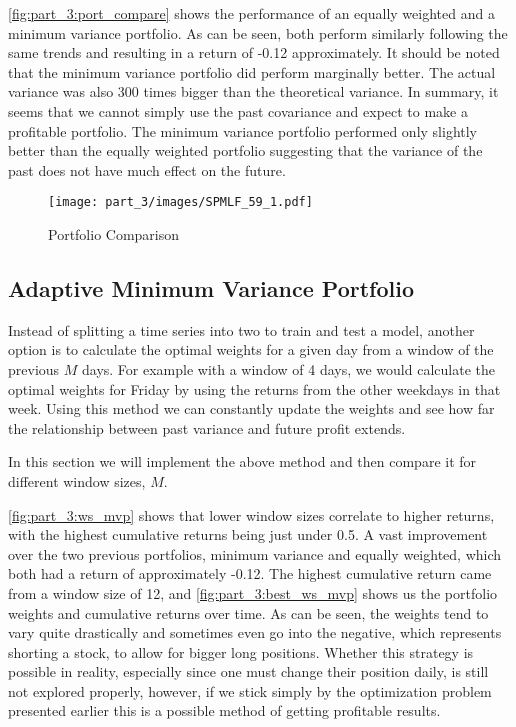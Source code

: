 \autoref{fig:part_3:port_compare} shows the performance of an equally weighted and a minimum variance portfolio. As can be seen, both perform similarly following the same trends and resulting in a return of -0.12 approximately. It should be noted that the minimum variance portfolio did perform marginally better. The actual variance was also 300 times bigger than the theoretical variance. In summary, it seems that we cannot simply use the past covariance and expect to make a profitable portfolio. The minimum variance portfolio performed only slightly better than the equally weighted portfolio suggesting that the variance of the past does not have much effect on the future.

\begin{figure}[!htb]
    \centering
    \texttt{[image: part\_3/images/SPMLF\_59\_1.pdf]}
    \caption{Portfolio Comparison}
    \label{fig:part_3:port_compare}
\end{figure}

\subsection{Adaptive Minimum Variance Portfolio}

Instead of splitting a time series into two to train and test a model, another option is to calculate the optimal weights for a given day from a window of the previous $M$ days. For example with a window of 4 days, we would calculate the optimal weights for Friday by using the returns from the other weekdays in that week. Using this method we can constantly update the weights and see how far the relationship between past variance and future profit extends.

In this section we will implement the above method and then compare it for different window sizes, $M$.

\autoref{fig:part_3:ws_mvp} shows that lower window sizes correlate to higher returns, with the highest cumulative returns being just under 0.5. A vast improvement over the two previous portfolios, minimum variance and equally weighted, which both had a return of approximately -0.12. The highest cumulative return came from a window size of 12, and \autoref{fig:part_3:best_ws_mvp} shows us the portfolio weights and cumulative returns over time. As can be seen, the weights tend to vary quite drastically and sometimes even go into the negative, which represents shorting a stock, to allow for bigger long positions. Whether this strategy is possible in reality, especially since one must change their position daily, is still not explored properly, however, if we stick simply by the optimization problem presented earlier this is a possible method of getting profitable results. 

